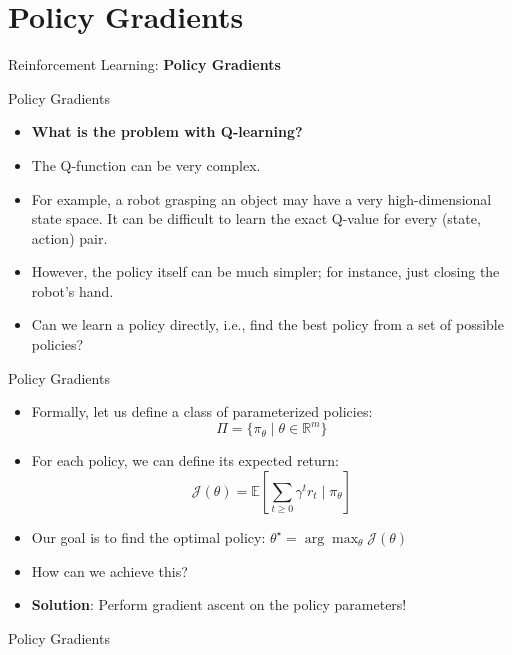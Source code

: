 \section{Policy Gradients}
\begin{frame}{}
    \LARGE Reinforcement Learning: \textbf{Policy Gradients}
\end{frame}

\begin{frame}{Policy Gradients}
    \begin{itemize}
        \setlength{\itemsep}{1em}
        \item {\large \textbf{What is the problem with Q-learning?}}
        \item The Q-function can be very complex.
        \item For example, a robot grasping an object may have a very high-dimensional state space. It can be difficult to learn the exact Q-value for every (state, action) pair.
        \pause
        \item However, the policy itself can be much simpler; for instance, just closing the robot's hand.
        \item Can we learn a policy directly, i.e., find the best policy from a set of possible policies?
    \end{itemize}
\end{frame}

\begin{frame}{Policy Gradients}
    \begin{itemize}
        \item Formally, let us define a class of parameterized policies: 
        $$\Pi = \{ \pi_\theta \mid \theta \in \mathbb{R}^m \}$$
        \item For each policy, we can define its expected return:
        $$\mathcal{J}(\theta) = \mathbb{E} \left [ \sum_{t \geq 0} \gamma^t r_t \mid \pi_\theta \right ]$$
        \pause
        \item Our goal is to find the optimal policy: $\theta^{\star} = \arg \max_\theta \mathcal{J}(\theta)$
        \item How can we achieve this?
        \pause
        \item \textbf{Solution}: Perform gradient ascent on the policy parameters!
    \end{itemize}
\end{frame}

\begin{frame}{Policy Gradients}
    \begin{figure}
        \centering
    \end{figure}
\end{frame}
